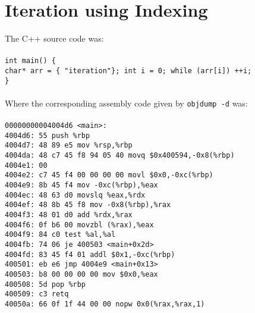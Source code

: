 \documentclass{article}
\begin{document}
 
 \section*{Iteration using Indexing}
 The C++ source code was: 
 \\
 \\
 \texttt{int main() \{} \\
 \texttt{char* arr = \{ "iteration"\}; int i = 0; while (arr[i]) ++i; }
 \\
 \texttt{\}}
 \\
 \\
 Where the corresponding assembly code given by \texttt{objdump -d} was:
 \\
 \\
 \texttt{00000000004004d6 <main>:}
 \\\texttt{4004d6:	55                   	push   \%rbp}
 \\\texttt{4004d7:	48 89 e5             	mov    \%rsp,\%rbp}
 \\\texttt{4004da:	48 c7 45 f8 94 05 40 	movq   \$0x400594,-0x8(\%rbp)}
 \\\texttt{4004e1:	00 }
 \\\texttt{4004e2:	c7 45 f4 00 00 00 00 	movl   \$0x0,-0xc(\%rbp)}
 \\\texttt{4004e9:	8b 45 f4             	mov    -0xc(\%rbp),\%eax}
 \\\texttt{4004ec:	48 63 d0             	movslq \%eax,\%rdx}
 \\\texttt{4004ef:	48 8b 45 f8          	mov    -0x8(\%rbp),\%rax}
 \\\texttt{4004f3:	48 01 d0             	add    \%rdx,\%rax}
 \\\texttt{4004f6:	0f b6 00             	movzbl (\%rax),\%eax}
 \\\texttt{4004f9:	84 c0                	test   \%al,\%al}
 \\\texttt{4004fb:	74 06                	je     400503 <main+0x2d>}
 \\\texttt{4004fd:	83 45 f4 01          	addl   \$0x1,-0xc(\%rbp)}
 \\\texttt{400501:	eb e6                	jmp    4004e9 <main+0x13>}
 \\\texttt{400503:	b8 00 00 00 00       	mov    \$0x0,\%eax}
 \\\texttt{400508:	5d                   	pop    \%rbp}
 \\\texttt{400509:	c3                   	retq   }
 \\\texttt{40050a:	66 0f 1f 44 00 00    	nopw   0x0(\%rax,\%rax,1)}
\end{document}
